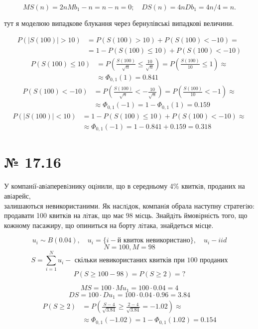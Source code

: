 \documentclass[11pt, a4paper]{article} %
\begin{document}
\[MS(n) = 2n Mb_1 - n = n - n = 0;\quad DS(n) = 4n Db_1 = 4n/4 = n.\]

тут я моделюю випадкове блукання через бернулівські випадкові величини.

\begin{align*}
    P(|S(100)| > 10) &= P(S(100) > 10) + P(S(100) < -10) = \\
    &= 1 - P(S(100) \le 10) + P(S(100) < -10)
\end{align*}
\begin{align*}
    P(S(100) \le 10) &= P(\frac{S(100)}{\sqrt{n}} \le \frac{10}{\sqrt{n}} ) = P(\frac{S(100)}{10} \le 1) \approx \\
    &\approx \Phi_{0,1}(1) = 0.841
\end{align*}
\begin{align*}
    P(S(100) < -10) &= P(\frac{S(100)}{\sqrt{n}} < -\frac{10}{\sqrt{n}} ) = P(\frac{S(100)}{10} < -1) \approx \\
    &\approx \Phi_{0,1}(-1) = 1 - \Phi_{0,1}(1) = 0.159
\end{align*}
\begin{align*}
    P(|S(100)| < 10) &= 1 - P(S(100) \le 10) + P(S(100) < -10) \approx \\
    &\approx \Phi_{0,1}(-1) = 1 - 0.841 + 0.159 = \boxed{0.318}
\end{align*}

\section*{№ 17.16}
\begin{mdframed}
    У компанiї-авiаперевiзнику оцiнили, що в середньому 4\% квиткiв, проданих 
    на авiарейс, \\ залишаються невикористаними. Як наслiдок, компанiя обрала наступну
    стратегiю: продавати 100 квиткiв на лiтак, що має 98 мiсць. 
    Знайдiть ймовiрнiсть того, що кожному пасажиру, що опиниться на борту лiтака, знайдеться мiсце.
\end{mdframed}

\[u_i \sim B(0.04), \quad u_i = \{i-\text{й квиток невикористано}\}, \quad u_i - iid\]
\[N = 100, M = 98\]
\[S = \sum_{i=1}^N u_i - \text{ скільки невикористаних квитків при 100 проданих}\]
\[\boxed{P(S \ge 100-98) = P(S \ge 2) = ?}\]

\[MS = 100 \cdot Mu_1 = 100 \cdot 0.04 = 4\]
\[DS = 100 \cdot Du_1 = 100 \cdot 0.04 \cdot 0.96 = 3.84\]
\begin{align*}
    P(S \ge 2) &= P(\frac{S - 4}{\sqrt{3.84}}\ge \frac{2-4}{\sqrt{3.84}} = -1.02) \approx \\
    &\approx \Phi_{0,1}(-1.02) = 1-\Phi_{0,1}(1.02) = \boxed{0.154}
\end{align*}
\pagebreak
\end{document}
